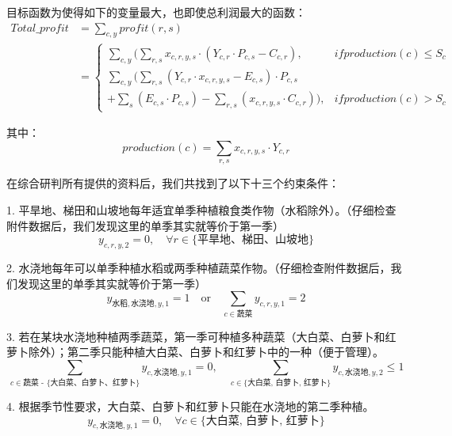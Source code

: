 \documentclass{cumcmthesis}
\begin{document}
目标函数为使得如下的变量最大，也即使总利润最大的函数：\\
\begin{align}
    Total\_profit &= \sum_{c, y} profit(r, s)  \\ 
    &=\begin{cases} 
        \sum_{c, y}(\sum_{r, s} x_{c, r, y, s} \cdot(Y_{c, r} \cdot P_{c, s} - C_{c, r}), 
            & if production(c) \leq S_c \\
        \sum_{c, y}(\sum_{r, s}(Y_{c, r} \cdot x_{c, r, y, s} - E_{c, s}) \cdot P_{c, s} \\
                    + \sum_{s}(E_{c, s} \cdot P_{c, s}) - \sum_{r, s}(x_{c, r, y, s} \cdot C_{c, r})), 
            & if production(c) > S_c
    \end{cases}
\end{align}

其中：
\begin{equation}
    production(c) = \sum_{r, s} x_{c,r,y,s} \cdot Y_{c,r}
\end{equation}

在综合研判所有提供的资料后，我们共找到了以下十三个约束条件：

1. 平旱地、梯田和山坡地每年适宜单季种植粮食类作物（水稻除外）。（仔细检查附件数据后，我们发现这里的单季其实就等价于第一季）
   \begin{equation}
    y_{c,r,y,2} = 0, \quad \forall r \in \{\text{平旱地、梯田、山坡地}\}  %
   \end{equation}

2. 水浇地每年可以单季种植水稻或两季种植蔬菜作物。（仔细检查附件数据后，我们发现这里的单季其实就等价于第一季）
   \begin{equation}
    y_{\text{水稻},\text{水浇地},y,1} = 1 \quad \text{or} \quad  %
    \sum_{c \in \text{蔬菜}} y_{c,r,y,1} = 2 
   \end{equation}

3. 若在某块水浇地种植两季蔬菜，第一季可种植多种蔬菜（大白菜、白萝卜和红萝卜除外）；第二季只能种植大白菜、白萝卜和红萝卜中的一种（便于管理）。
   \begin{equation}
   \sum_{c \in \text{蔬菜 - \{大白菜、白萝卜、红萝卜\}}} y_{c,\text{水浇地},y,1} = 0, \quad \sum_{c \in \{\text{大白菜, 白萝卜, 红萝卜}\}} y_{c,\text{水浇地},y,2} \leq 1
   \end{equation}

4. 根据季节性要求，大白菜、白萝卜和红萝卜只能在水浇地的第二季种植。
   \begin{equation}
   y_{c,\text{水浇地},y,1} = 0, \quad \forall c \in \{\text{大白菜, 白萝卜, 红萝卜}\}
   \end{equation}
\end{document}
